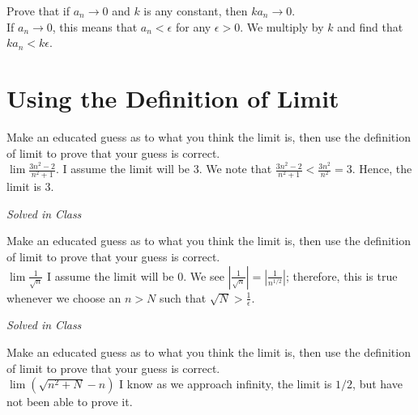 \documentclass[12pt]{book}
\newenvironment{exercise}[2][Exercise]{\begin{trivlist}
\item[\hskip \labelsep {\bfseries #1}\hskip \labelsep {\bfseries #2.}]}{\end{trivlist}}
\begin{document}
\begin{exercise}{2.1.11}
Prove that if $a_n \to 0$ and $k$ is any constant, then $k a_n \to 0$. \\

If $a_n \to 0$, this means that $a_n < \epsilon$ for any $\epsilon > 0$. We multiply by $k$ and find that $k a_n < k \epsilon$.
\end{exercise}



\section{Using the Definition of Limit}


\begin{exercise}{2.2.1}
Make an educated guess as to what you think the limit is, then use the definition of limit to prove that your guess is correct.\\

$\lim \frac{3n^2 -2}{n^2 +1}$. I assume the limit will be $3$. We note that $\frac{3n^2 - 2}{n^2+1} <  \frac{3n^2}{n^2} = 3$. Hence, the limit is 3.
\end{exercise}

\begin{exercise}{2.2.2}
\emph{Solved in Class}
\end{exercise}

\begin{exercise}{2.2.3}
Make an educated guess as to what you think the limit is, then use the definition of limit to prove that your guess is correct.\\

$\lim \frac{1}{\sqrt{n}} $ I assume the limit will be $0$. We see $| \frac{1}{\sqrt{n}}| = | \frac{1}{n^{1/2}}|$; therefore, this is true whenever we choose an $n>N$ such that $\sqrt{N}> \frac{1}{\epsilon}$.
\end{exercise}

\begin{exercise}{2.2.4}
\emph{Solved in Class}
\end{exercise}


\begin{exercise}{2.2.5}
Make an educated guess as to what you think the limit is, then use the definition of limit to prove that your guess is correct.\\

$\lim (\sqrt{n^2 + N} -n) $ I know as we approach infinity, the limit is $1/2$, but have not been able to prove it.
\end{exercise}
\end{document}
